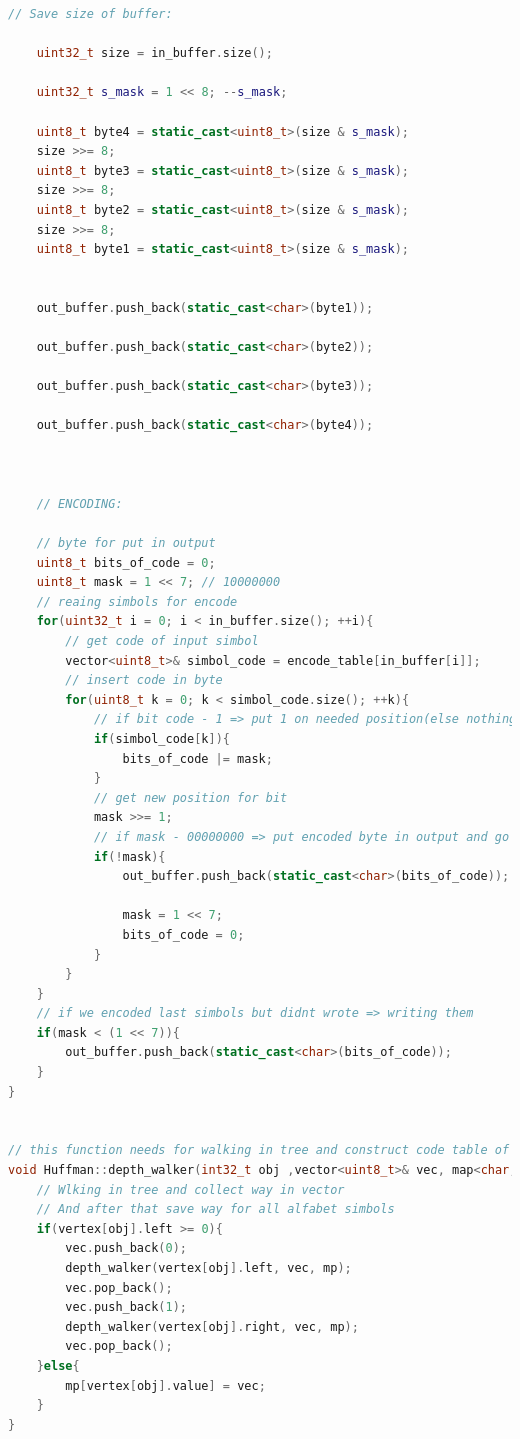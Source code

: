\begin{lstlisting}[language=C++]
    // Save size of buffer:

    uint32_t size = in_buffer.size();

    uint32_t s_mask = 1 << 8; --s_mask;

    uint8_t byte4 = static_cast<uint8_t>(size & s_mask);
    size >>= 8;
    uint8_t byte3 = static_cast<uint8_t>(size & s_mask);
    size >>= 8;
    uint8_t byte2 = static_cast<uint8_t>(size & s_mask);
    size >>= 8;
    uint8_t byte1 = static_cast<uint8_t>(size & s_mask);


    out_buffer.push_back(static_cast<char>(byte1));

    out_buffer.push_back(static_cast<char>(byte2));

    out_buffer.push_back(static_cast<char>(byte3));

    out_buffer.push_back(static_cast<char>(byte4));



    // ENCODING:

    // byte for put in output
    uint8_t bits_of_code = 0;
    uint8_t mask = 1 << 7; // 10000000
    // reaing simbols for encode
    for(uint32_t i = 0; i < in_buffer.size(); ++i){
        // get code of input simbol
        vector<uint8_t>& simbol_code = encode_table[in_buffer[i]];
        // insert code in byte 
        for(uint8_t k = 0; k < simbol_code.size(); ++k){
            // if bit code - 1 => put 1 on needed position(else nothing to do)
            if(simbol_code[k]){
                bits_of_code |= mask;
            }
            // get new position for bit
            mask >>= 1;
            // if mask - 00000000 => put encoded byte in output and go to encode new byte
            if(!mask){
                out_buffer.push_back(static_cast<char>(bits_of_code));

                mask = 1 << 7;
                bits_of_code = 0;
            }
        }
    }
    // if we encoded last simbols but didnt wrote => writing them
    if(mask < (1 << 7)){ 
        out_buffer.push_back(static_cast<char>(bits_of_code));
    }
}


// this function needs for walking in tree and construct code table of simbols  
void Huffman::depth_walker(int32_t obj ,vector<uint8_t>& vec, map<char, vector<uint8_t>>& mp){
    // Wlking in tree and collect way in vector
    // And after that save way for all alfabet simbols 
    if(vertex[obj].left >= 0){
        vec.push_back(0);
        depth_walker(vertex[obj].left, vec, mp);
        vec.pop_back();
        vec.push_back(1);
        depth_walker(vertex[obj].right, vec, mp);
        vec.pop_back();
    }else{
        mp[vertex[obj].value] = vec;
    }
}



\end{lstlisting}
